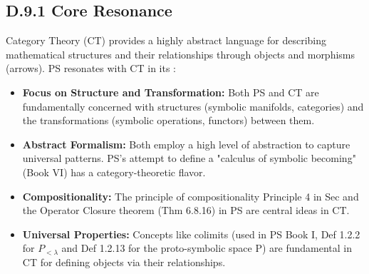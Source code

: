 \subsection*{D.9.1 Core Resonance}
\label{subsec:appD_category_theory_core_resonance}
Category Theory (CT) provides a highly abstract language for describing mathematical structures and their relationships through objects and morphisms (arrows). PS resonates with CT in its \cite{maclane1971}:
\begin{itemize}
    \item \textbf{Focus on Structure and Transformation:} Both PS and CT are fundamentally concerned with structures (symbolic manifolds, categories) and the transformations (symbolic operations, functors) between them.
    \item \textbf{Abstract Formalism:} Both employ a high level of abstraction to capture universal patterns. PS's attempt to define a "calculus of symbolic becoming" (Book VI) has a category-theoretic flavor.
    \item \textbf{Compositionality:} The principle of compositionality Principle 4 in Sec and the Operator Closure theorem (Thm 6.8.16) in PS are central ideas in CT.
    \item \textbf{Universal Properties:} Concepts like colimits (used in PS Book I, Def 1.2.2 for \(P_{<\lambda}\) and Def 1.2.13 for the proto-symbolic space P) are fundamental in CT for defining objects via their relationships.
\end{itemize}
